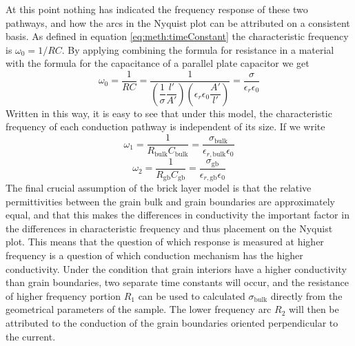 At this point nothing has indicated the frequency response of these two pathways, and how the arcs in the Nyquist plot can be attributed on a consistent basis. As defined in equation \ref{eq:meth:timeConstant} the characteristic frequency is $\omega_0 = 1/RC$. By applying combining the formula for resistance in a material with the formula for the capacitance of a parallel plate capacitor we get
\begin{equation}
    \omega_0 = \frac{1}{RC} = \frac{1}{\left(\dfrac{1}{\sigma} \dfrac{l'}{A'}\right)\left(\epsilon_r \epsilon_0 \dfrac{A'}{l'}\right)} = \frac{\sigma}{\epsilon_r \epsilon_0}
\end{equation}
Written in this way, it is easy to see that under this model, the characteristic frequency of each conduction pathway is independent of its size. If we write
\begin{equation*}
    \omega_1 = \frac{1}{R_{\mathrm{bulk}} C_{\mathrm{bulk}}} = \frac{\sigma_{\mathrm{bulk}}}{\epsilon_{r, \mathrm{bulk}} \epsilon_0}
\end{equation*}
\begin{equation*}
    \omega_2 = \frac{1}{R_{\mathrm{gb}} C_{\mathrm{gb}}} = \frac{\sigma_{\mathrm{gb}}}{\epsilon_{r, \mathrm{gb}} \epsilon_0}
\end{equation*}
The final crucial assumption of the brick layer model is that the relative permittivities between the grain bulk and grain boundaries are approximately equal, and that this makes the differences in conductivity the important factor in the differences in characteristic frequency and thus placement on the Nyquist plot. This means that the question of which response is measured at higher frequency is a question of which conduction mechanism has the higher conductivity. Under the condition that grain interiors have a higher conductivity than grain boundaries, two separate time constants will occur, and the resistance of higher frequency portion $R_1$ can be used to  calculated $\sigma_{\mathrm{bulk}}$ directly from the geometrical parameters of the sample. The lower frequency arc $R_2$ will then be attributed to the conduction of the grain boundaries oriented perpendicular to the current.


